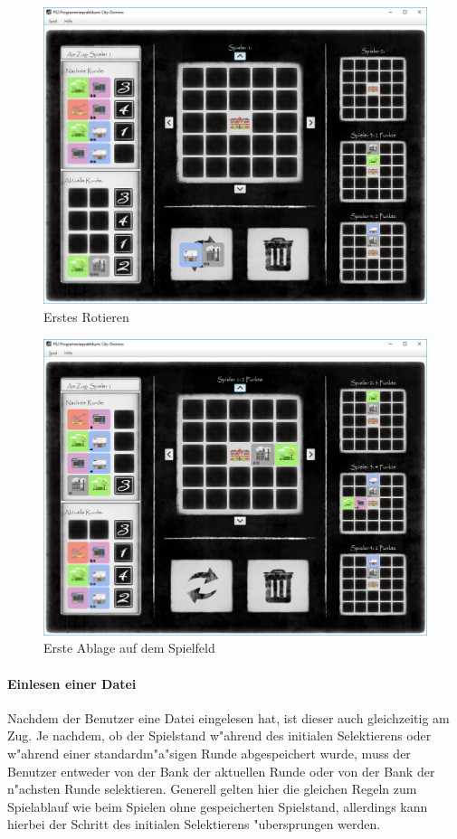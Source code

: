 \begin{figure}
	\centering
	\includegraphics{screenshots/screenshot_ErstesRotieren.png}
	\caption{Erstes Rotieren}
	\label{fig:erstesRotieren}
\end{figure}

\begin{figure}
	\centering
	\includegraphics{screenshots/screenshot_ErsteAblage.png}
	\caption[Erste Ablage]{Erste Ablage auf dem Spielfeld}
	\label{fig:ersteAblage}
\end{figure}

\paragraph{Einlesen einer Datei}
Nachdem der Benutzer eine Datei eingelesen hat, ist dieser auch gleichzeitig am Zug. Je nachdem, ob der Spielstand w"ahrend des initialen Selektierens oder w"ahrend einer standardm"a"sigen Runde abgespeichert wurde, muss der Benutzer entweder von der Bank der aktuellen Runde oder von der Bank der n"achsten Runde selektieren. Generell gelten hier die gleichen Regeln zum Spielablauf wie beim Spielen ohne gespeicherten Spielstand, allerdings kann hierbei der Schritt des initialen Selektierens "ubersprungen werden. 

